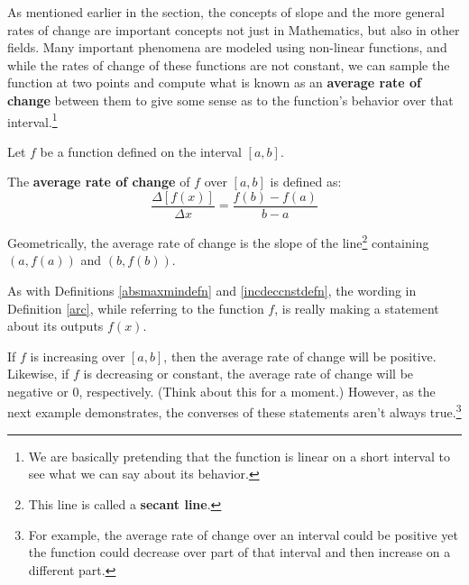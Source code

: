 \documentclass{ximera}
\begin{document}
	\author{Stitz-Zeager}
\begin{abstract}
\end{abstract}
\label{AverageRateofChange}

As mentioned earlier in the section, the concepts of slope and the more general rates of change are important concepts not just in Mathematics, but also in other fields.   Many important phenomena are modeled using non-linear functions, and while the rates of change of these functions are not constant, we can sample the function at two points and compute what is known as an \textbf{average rate of change} between them to give some sense as to the function's behavior over that interval.\footnote{We are basically pretending that the function is linear on a short interval to see what we can say about its behavior.}


\begin{definition} \label{arc}  Let $f$ be a function defined on the interval $[a,b]$. 

 The \textbf{average rate of change}  of $f$ over $[a,b]$ is defined as: \[ \frac{\Delta [f(x)]}{\Delta x} = \frac{f(b) - f(a)}{b-a} \]

Geometrically, the average rate of change is the slope of the line\footnote{This line is called a \textbf{secant line}.}  containing $(a, f(a))$ and $(b, f(b))$.

\end{definition}


\begin{center}
\end{center}

As with Definitions \ref{absmaxmindefn}  and \ref{incdeccnstdefn}, the wording in Definition \ref{arc}, while referring to the function $f$, is really making a statement about its outputs $f(x)$.  



If $f$ is increasing over $[a,b]$, then the average rate of change will be positive. Likewise, if $f$ is decreasing or constant, the average rate of change will be negative or $0$, respectively. (Think about this for a moment.) However, as the next example demonstrates, the converses of these statements aren't always true.\footnote{For example, the average rate of change over an interval could be positive yet the function could decrease over part of that interval and then increase on a different part.}
\end{document}

